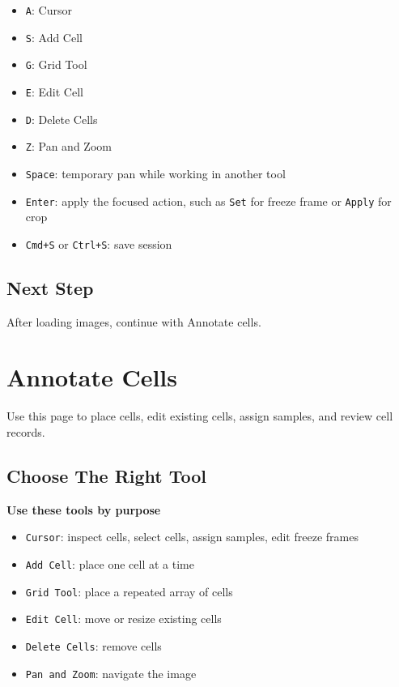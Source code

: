 \documentclass[
  9pt,
  letterpaper,
  oneside,
  open=any,
  DIV=15,
  parskip=half-,
  headings=big,
  numbers=noenddot
]{scrbook}
\newcommand{\manuallead}[1]{%
  \vspace{0.15em}%
  {\sffamily\bfseries\color{ManualBlue}#1}\par\nobreak\vspace{0.05em}%
}
\begin{document}
\begin{itemize}[leftmargin=*,itemsep=0.35em,topsep=0.4em]
\item \texttt{A}: Cursor
\item \texttt{S}: Add Cell
\item \texttt{G}: Grid Tool
\item \texttt{E}: Edit Cell
\item \texttt{D}: Delete Cells
\item \texttt{Z}: Pan and Zoom
\item \texttt{Space}: temporary pan while working in another tool
\item \texttt{Enter}: apply the focused action, such as \texttt{Set} for freeze frame or \texttt{Apply} for crop
\item \texttt{Cmd+S} or \texttt{Ctrl+S}: save session
\end{itemize}

\section{Next Step}

After loading images, continue with Annotate cells.


\chapter{Annotate Cells}

Use this page to place cells, edit existing cells, assign samples, and review cell records.


\section{Choose The Right Tool}

\manuallead{Use these tools by purpose}

\begin{itemize}[leftmargin=*,itemsep=0.35em,topsep=0.4em]
\item \texttt{Cursor}: inspect cells, select cells, assign samples, edit freeze frames
\item \texttt{Add Cell}: place one cell at a time
\item \texttt{Grid Tool}: place a repeated array of cells
\item \texttt{Edit Cell}: move or resize existing cells
\item \texttt{Delete Cells}: remove cells
\item \texttt{Pan and Zoom}: navigate the image
\end{itemize}
\end{document}
